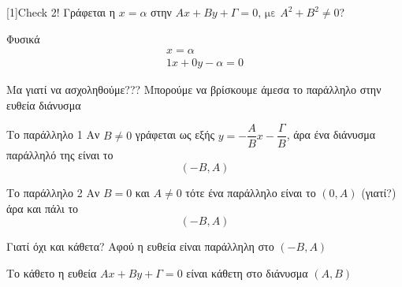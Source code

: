 \documentclass{../../presentation}
\begin{document}
\begin{frame}{\scalebox{-1}[1]{Check 2!}}
  Γράφεται η $x=α$ στην $Αx+Βy+Γ=0 \text{, με } Α^2+Β^2\ne 0$?

   Φυσικά
  \begin{align*}
    x=α \\
    1x+0y-α=0
  \end{align*}
\end{frame}

\begin{frame}{Μα γιατί να ασχοληθούμε???}
  Μπορούμε να βρίσκουμε άμεσα το παράλληλο στην ευθεία διάνυσμα
  \begin{block}{Το παράλληλο 1}
    Αν $Β\ne 0$ γράφεται ως εξής $y=-\dfrac{Α}{Β}x-\dfrac{Γ}{Β}$, άρα ένα διάνυσμα παράλληλό της είναι το $$(-Β,Α)$$
  \end{block}
  \begin{block}{Το παράλληλο 2}
    Αν $Β= 0$ και $Α\ne 0$ τότε ένα παράλληλο είναι το $(0,Α)$ (γιατί?) άρα και πάλι το $$(-Β,Α)$$
  \end{block}
\end{frame}

\begin{frame}{Γιατί όχι και κάθετα?}
  Αφού η ευθεία είναι παράλληλη στο $(-Β,Α)$
  \begin{block}{Το κάθετο}
    η ευθεία $Αx+Βy+Γ=0$ είναι κάθετη στο διάνυσμα $(Α,Β)$
  \end{block}

\end{frame}
\end{document}

